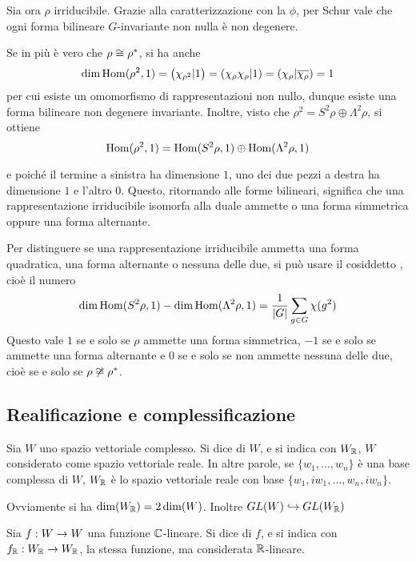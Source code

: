 	
	Sia ora $\rho$ irriducibile. Grazie alla caratterizzazione con la $\phi$, per Schur vale che ogni forma bilineare $G$-invariante non nulla è non degenere.
	
	Se in più è vero che $\rho\cong\rho^*$, si ha anche 
	\[
		\dim\operatorname{Hom}(\rho^2,1)=\left(\chi_{\rho^2} | 1\right) = \left(\chi_\rho\chi_\rho | 1\right) = \left(\chi_\rho | \overline{\chi_\rho}\right) = 1
	\]
	per cui esiste un omomorfismo di rappresentazioni non nullo, dunque esiste una forma bilineare non degenere invariante. Inoltre, visto che $\rho^2 = S^2\rho \oplus \Lambda^2\rho$, si ottiene
	\[
		\operatorname{Hom}(\rho^2,1)=\operatorname{Hom}(S^2\rho,1) \oplus \operatorname{Hom}(\Lambda^2\rho,1)
	\]
	
	e poiché il termine a sinistra ha dimensione $1$, uno dei due pezzi a destra ha dimensione $1$ e l'altro $0$. Questo, ritornando alle forme bilineari, significa che una rappresentazione irriducibile isomorfa alla duale ammette o una forma simmetrica oppure una forma alternante.
	
	\begin{myobs}
		Per distinguere se una rappresentazione irriducibile ammetta una forma quadratica, una forma alternante o nessuna delle due, si può usare il cosiddetto , cioè il numero
		\[
			\dim\operatorname{Hom}(S^2\rho,1)-\dim\operatorname{Hom}(\Lambda^2\rho,1) = \frac{1}{\left|G\right|}\sum_{g\in G}\chi(g^2)
		\]
		Questo vale $1$ se e solo se $\rho$ ammette una forma simmetrica, $-1$ se e solo se ammette una forma alternante e $0$ se e solo se non ammette nessuna delle due, cioè se e solo se $\rho\not\cong\rho^*$.

	\end{myobs}
	
	
	
\subsection{Realificazione e complessificazione}
	
	\begin{mydef}
		Sia $W$ uno spazio vettoriale complesso. Si dice  di $W$, e si indica con $W_\mathbb R$, $W$ considerato come spazio vettoriale reale. In altre parole, se $\{w_1,\ldots,w_n\}$ è una base complessa di $W$, $W_\mathbb R$ è lo spazio vettoriale reale con base $\{w_1,i w_1,\ldots,w_n,i w_n\}$.
	\end{mydef}
	
	Ovviamente si ha $\dim(W_\mathbb R)=2\dim(W)$. Inoltre $GL(W)\hookrightarrow GL(W_\mathbb R)$
	
	\begin{mydef}
		Sia $f:W \rightarrow W$ una funzione $\mathbb C$-lineare. Si dice  di $f$, e si indica con $f_\mathbb R:W_\mathbb R \rightarrow W_\mathbb R$, la stessa funzione, ma considerata $\mathbb R$-lineare.
	\end{mydef}
	
